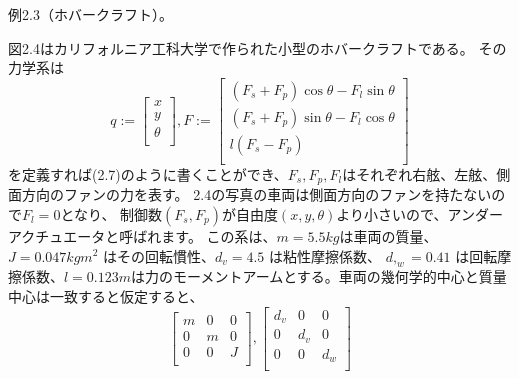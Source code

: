 \documentclass{jsarticle}
\begin{document}
例2.3（ホバークラフト）。\par
図2.4はカリフォルニア工科大学で作られた小型のホバークラフトである。
その力学系は
\begin{equation}
  q := 
  \begin{bmatrix}
    x \\
    y \\
    \theta\\
  \end{bmatrix}
  ,F := 
  \begin{bmatrix}
    (F_s+F_p)\cos{\theta}-F_l\sin{\theta}\\
    (F_s+F_p)\sin{\theta}-F_l\cos{\theta}\\
    l(F_s-F_p)\\
  \end{bmatrix}
\end{equation}
を定義すれば(2.7)のように書くことができ、$F_s,F_p,F_l$はそれぞれ右舷、左舷、側面方向のファンの力を表す。
2.4の写真の車両は側面方向のファンを持たないので$F_l=0$となり、
制御数$(F_s,F_p)$が自由度$(x,y,\theta)$より小さいので、アンダーアクチュエータと呼ばれます。
この系は、$m = 5.5 \si{kg}$は車両の質量、$J = 0.047 \si{kgm^2}$ はその回転慣性、$d_v = 4.5$ は粘性摩擦係数、
$d,_w= 0.41$ は回転摩擦係数、$l = 0.123 \si{m}$は力のモーメントアームとする。車両の幾何学的中心と質量中心は一致すると仮定すると、
\begin{equation}
  \begin{bmatrix}
    m&0&0 \\
    0&m&0 \\
    0&0&J \\
  \end{bmatrix}
  ,
  \begin{bmatrix}
    d_v&0&0 \\
    0&d_v&0 \\
    0&0&d_w \\
  \end{bmatrix}
\end{equation}
\end{document}
